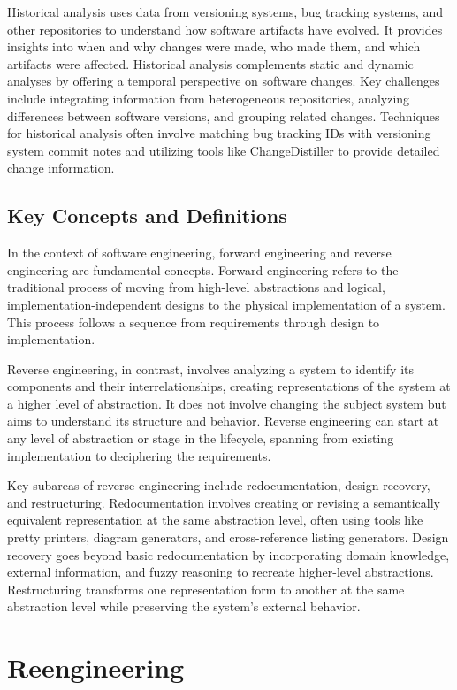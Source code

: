 Historical analysis uses data from versioning systems, bug tracking systems, and other repositories to understand how software artifacts have evolved. It provides insights into when and why changes were made, who made them, and which artifacts were affected. Historical analysis complements static and dynamic analyses by offering a temporal perspective on software changes. Key challenges include integrating information from heterogeneous repositories, analyzing differences between software versions, and grouping related changes. Techniques for historical analysis often involve matching bug tracking IDs with versioning system commit notes and utilizing tools like ChangeDistiller to provide detailed change information.

\subsection{Key Concepts and Definitions}

In the context of software engineering, forward engineering and reverse engineering are fundamental concepts. Forward engineering refers to the traditional process of moving from high-level abstractions and logical, implementation-independent designs to the physical implementation of a system. This process follows a sequence from requirements through design to implementation.

Reverse engineering, in contrast, involves analyzing a system to identify its components and their interrelationships, creating representations of the system at a higher level of abstraction. It does not involve changing the subject system but aims to understand its structure and behavior. Reverse engineering can start at any level of abstraction or stage in the lifecycle, spanning from existing implementation to deciphering the requirements.

Key subareas of reverse engineering include redocumentation, design recovery, and restructuring. Redocumentation involves creating or revising a semantically equivalent representation at the same abstraction level, often using tools like pretty printers, diagram generators, and cross-reference listing generators. Design recovery goes beyond basic redocumentation by incorporating domain knowledge, external information, and fuzzy reasoning to recreate higher-level abstractions. Restructuring transforms one representation form to another at the same abstraction level while preserving the system's external behavior.


\section{Reengineering}
\cite{SoftwareEvolutionMens2008}

